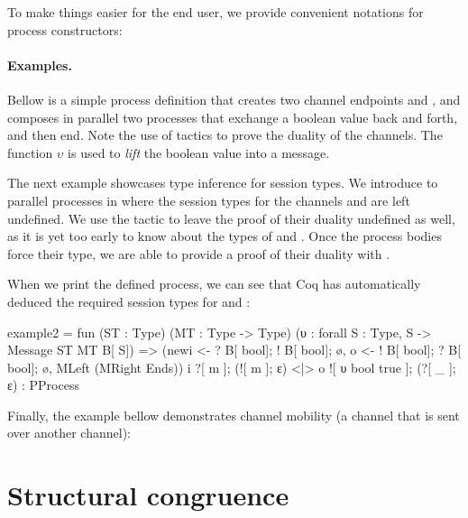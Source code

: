 \documentclass{mproj}
\begin{document}

To make things easier for the end user, we provide convenient notations for process constructors:


\paragraph{Examples.} Bellow is a simple process definition that creates two channel endpoints  and , and composes in parallel two processes that exchange a boolean value back and forth, and then end. Note the use of tactics to prove the duality of the channels. The function $\upsilon$ is used to \emph{lift} the boolean value  into a message.


The next example showcases type inference for session types. We introduce to parallel processes in where the session types for the channels  and  are left undefined. We use the tactic  to leave the proof of their duality undefined as well, as it is yet too early to know about the types of  and . Once the process bodies force their type, we are able to provide a proof of their duality with .


When we print the defined process, we can see that Coq has automatically deduced the required session types for  and :

\begin{coq}
example2 = 
fun (ST : Type) (MT : Type -> Type) (υ : forall S : Type, S -> Message ST MT B[ S]) =>
(newi <- ? B[ bool]; ! B[ bool]; ø, o <- ! B[ bool]; ? B[ bool]; ø,
MLeft (MRight Ends)) i ?[ m ]; (![ m ]; ε) <|> o ![ υ bool true ]; (?[ _ ]; ε)
     : PProcess
\end{coq}

Finally, the example bellow demonstrates channel mobility (a channel that is sent over another channel):


\section{Structural congruence}\label{structural-congruence}
\end{document}

